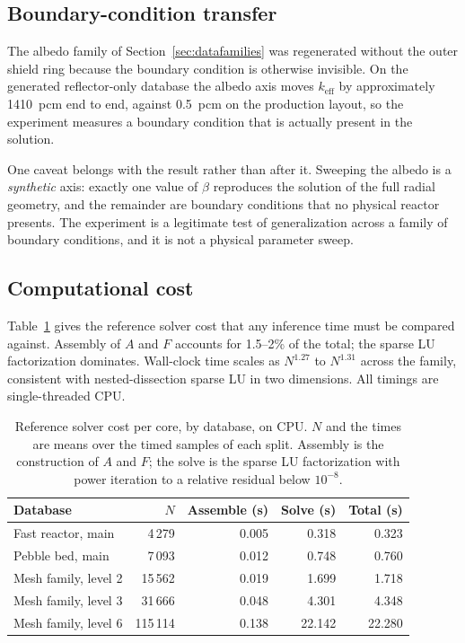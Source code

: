 \documentclass[preprint,12pt]{elsarticle}
\newcommand{\keff}{k_{\mathrm{eff}}}
\begin{document}
\subsection{Boundary-condition transfer}
\label{sec:res-bc}

The albedo family of Section~\ref{sec:datafamilies} was regenerated without the
outer shield ring because the boundary condition is otherwise invisible. On the
generated reflector-only database the albedo axis moves $\keff$ by
approximately 1410~pcm end to end, against 0.5~pcm on the production layout, so
the experiment measures a boundary condition that is actually present in the
solution.

One caveat belongs with the result rather than after it. Sweeping the albedo is
a \emph{synthetic} axis: exactly one value of $\beta$ reproduces the solution
of the full radial geometry, and the remainder are boundary conditions that no
physical reactor presents. The experiment is a legitimate test of
generalization across a family of boundary conditions, and it is not a physical
parameter sweep.


\subsection{Computational cost}
\label{sec:res-cost}

Table~\ref{tab:solvercost} gives the reference solver cost that any inference
time must be compared against. Assembly of $A$ and $F$ accounts for 1.5--2\% of
the total; the sparse LU factorization dominates. Wall-clock time scales as
$N^{1.27}$ to $N^{1.31}$ across the family, consistent with nested-dissection
sparse LU in two dimensions. All timings are single-threaded CPU.

\begin{table}[htbp]
\centering
\caption{Reference solver cost per core, by database, on CPU. $N$ and the times
are means over the timed samples of each split. Assembly is the construction of
$A$ and $F$; the solve is the sparse LU factorization with power iteration to a
relative residual below $10^{-8}$.}
\label{tab:solvercost}
\begin{tabular}{@{}lrrrr@{}}
\toprule
Database & $N$ & Assemble (s) & Solve (s) & Total (s) \\
\midrule
Fast reactor, main   & 4\,279   & 0.005 & 0.318  & 0.323  \\
Pebble bed, main     & 7\,093   & 0.012 & 0.748  & 0.760  \\
Mesh family, level 2 & 15\,562  & 0.019 & 1.699  & 1.718  \\
Mesh family, level 3 & 31\,666  & 0.048 & 4.301  & 4.348  \\
Mesh family, level 6 & 115\,114 & 0.138 & 22.142 & 22.280 \\
\bottomrule
\end{tabular}
\end{table}
\end{document}
